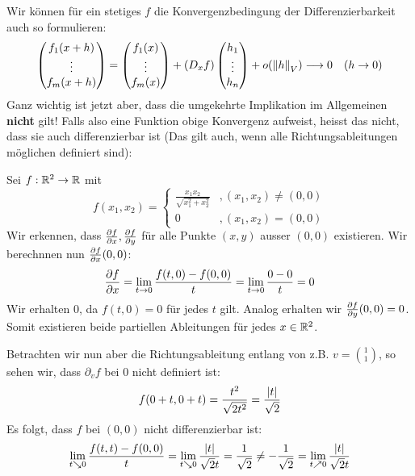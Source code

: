 Wir können für ein stetiges $f$ die Konvergenzbedingung der Differenzierbarkeit auch so formulieren:
$$\begin{pmatrix}f_1(x+h)  \\ \vdots  \\  f_m(x+h) \end{pmatrix} =
\begin{pmatrix}f_1(x)  \\ \vdots  \\  f_m(x) \end{pmatrix} +
(D_xf)\begin{pmatrix}h_1  \\ \vdots  \\  h_n\end{pmatrix} + o(\left\|h\right\|_V)  \longrightarrow 0 \quad (h \to 0)$$
Ganz wichtig ist jetzt aber, dass die umgekehrte Implikation im Allgemeinen \textbf{nicht} gilt! Falls also eine Funktion obige Konvergenz aufweist, heisst das nicht, dass sie auch differenzierbar ist (Das gilt auch, wenn alle Richtungsableitungen möglichen definiert sind):
\begin{example}
Sei $f: \mathbb{R}^2 \to \mathbb{R}$ mit
$$f(x_1,x_2) = \begin{cases} \frac{x_1x_2}{\sqrt{x_1^2+ x_2^2}} & ,(x_1, x_2) \neq (0,0) \\ 0 & , (x_1, x_2) = (0,0)\end{cases}$$
Wir erkennen, dass $\diffp{f}{x}, \diffp{f}{y}$ für alle Punkte $(x,y)$ ausser $(0,0)$ existieren. Wir berechnnen nun  $\diffp{f}{x}(0,0)$:
$$\diffp{f}{x} = \lim_{t \to 0} \frac{f(t,0) - f(0,0)}{t} =  \lim_{t \to 0} \frac{0 - 0}{t} = 0$$
Wir erhalten $0$, da $f(t,0) = 0$ für jedes $t$ gilt. Analog erhalten wir $\diffp{f}{y}(0,0) = 0$. Somit existieren beide partiellen Ableitungen für jedes $x \in \mathbb{R}^2$.

Betrachten wir nun aber die Richtungsableitung entlang von z.B. $v = \binom{1}{1}$, so sehen wir, dass $\partial_vf$ bei $0$ nicht definiert ist:
$$f(0+t, 0+t) = \frac{t^2}{\sqrt{2t^2}} = \frac{\left|t\right|}{\sqrt{2}}$$
Es folgt, dass $f$ bei $(0,0)$ nicht differenzierbar ist:
$$\lim_{t \searrow 0}\frac{f(t,t)-f(0,0)}{t} = \lim_{t \searrow 0} \frac{\left|t\right|}{\sqrt{2}t} = \frac{1}{\sqrt{2}} \neq -\frac{1}{\sqrt{2}} = \lim_{t \nearrow 0} \frac{\left|t\right|}{\sqrt{2}t}$$
\end{example}

